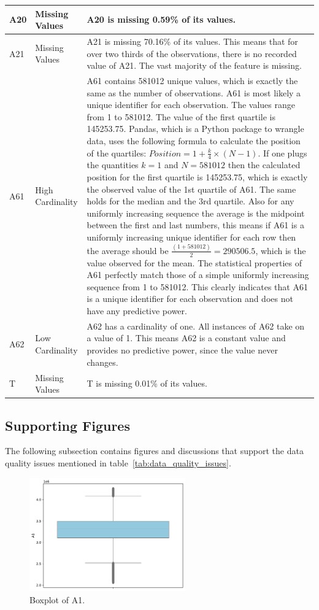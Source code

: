 \documentclass[11pt]{report}
\begin{document}
\begin{longtable}{lp{5cm}p{8cm}}
\midrule
A20 & Missing Values & A20 is missing 0.59\% of its values. \\
\midrule
A21 & Missing Values & A21 is missing 70.16\% of its values. This means that for over two thirds of the observations, there is no recorded value of A21. The vast majority of the feature is missing. \\
\midrule
A61 & High Cardinality & A61 contains 581012 unique values, which is exactly the same as the number of observations. A61 is most likely a unique identifier for each observation. The values range from 1 to 581012. The value of the first quartile is 145253.75. Pandas, which is a Python package to wrangle data, uses the following formula to calculate the position of the quartiles: $Position = 1 + \frac{k}{4} \times (N - 1)$. If one plugs the quantities $k = 1$ and $N = 581012$ then the calculated position for the first quartile is 145253.75, which is exactly the observed value of the 1st quartile of A61. The same holds for the median and the 3rd quartile. Also for any uniformly increasing sequence the average is the midpoint between the first and last numbers, this means if A61 is a uniformly increasing unique identifier for each row then the average should be $\frac{(1 + 581012)}{2} = 290506.5$, which is the value observed for the mean. The statistical properties of A61 perfectly match those of a simple uniformly increasing sequence from 1 to 581012. This clearly indicates that A61 is a unique identifier for each observation and does not have any predictive power. \\
\midrule
A62 & Low Cardinality & A62 has a cardinality of one. All instances of A62 take on a value of 1. This means A62 is a constant value and provides no predictive power, since the value never changes. \\
\midrule
T & Missing Values & T is missing 0.01\% of its values. \\
\end{longtable}


\subsection*{Supporting Figures}

The following subsection contains figures and discussions that support the data quality issues mentioned in table~\ref{tab:data_quality_issues}.

\begin{figure}[H]
    \centering
    \includegraphics[width=0.6\textwidth]{images/A1_boxplot.pdf}
    \caption{Boxplot of A1.}
    \label{fig:a1_boxplot}
\end{figure}
\end{document}
